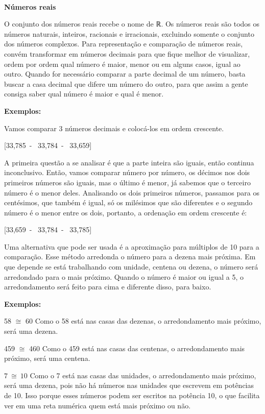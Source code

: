 ~

\textbf{Números reais}

O conjunto dos números reais recebe o nome de ℝ. Os números reais são
todos os números naturais, inteiros, racionais e irracionais, excluindo
somente o conjunto dos números complexos. Para representação e
comparação de números reais, convém transformar em números decimais para
que fique melhor de visualizar, ordem por ordem qual número é maior,
menor ou em alguns casos, igual ao outro. Quando for necessário comparar
a parte decimal de um número, basta buscar a casa decimal que difere um
número do outro, para que assim a gente consiga saber qual número é
maior e qual é menor.

\textbf{Exemplos:}

Vamos comparar 3 números decimais e colocá-los em ordem crescente.

[33,785\  - \ 33,784\  - \ 33,659]

A primeira questão a se analisar é que a parte inteira são iguais, então
continua inconclusivo. Então, vamos comparar número por número, os
décimos nos dois primeiros números são iguais, mas o último é menor, já
sabemos que o terceiro número é o menor deles. Analisando os dois
primeiros números, passamos para os centésimos, que também é igual, só
os milésimos que são diferentes e o segundo número é o menor entre os
dois, portanto, a ordenação em ordem crescente é:

[33,659\  - \ 33,784\  - \ 33,785]

Uma alternativa que pode ser usada é a aproximação para múltiplos de 10
para a comparação. Esse método arredonda o número para a dezena mais
próxima. Em que depende se está trabalhando com unidade, centena ou
dezena, o número será arredondado para o mais próximo. Quando o número é
maior ou igual a 5, o arredondamento será feito para cima e diferente
disso, para baixo.

\textbf{Exemplos:}

58 \(\cong\) 60 Como o 58 está nas casas das dezenas, o arredondamento
mais próximo, será uma dezena.

459 \(\cong\) 460 Como o 459 está nas casas das centenas, o
arredondamento mais próximo, será uma centena.

\(7\  \cong \ 10\) Como o 7 está nas casas das unidades, o
arredondamento mais próximo, será uma dezena, pois não há números nas
unidades que escrevem em potências de 10. Isso porque esses números
podem ser escritos na potência 10, o que facilita ver em uma reta
numérica quem está mais próximo ou não.

